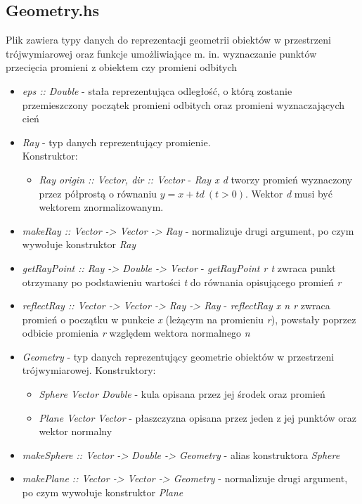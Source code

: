 \documentclass[11pt,a4paper]{article}
\begin{document}
\subsection{Geometry.hs}
Plik zawiera typy danych do reprezentacji geometrii obiektów w przestrzeni trójwymiarowej oraz funkcje umożliwiające m. in. wyznaczanie punktów przecięcia promieni z obiektem czy promieni odbitych
\begin{itemize}
\item\textit{eps :: Double} - stała reprezentująca odległość, o którą zostanie przemieszczony początek promieni odbitych oraz promieni wyznaczających cień
\item\textit{Ray} - typ danych reprezentujący promienie.\\Konstruktor:
\begin{itemize}
\item\textit{Ray { origin :: Vector, dir :: Vector }} - \textit{Ray x d} tworzy promień wyznaczony przez półprostą o równaniu $y = x + td\ (t > 0)$. Wektor \textit{d} musi być wektorem znormalizowanym.
\end{itemize}
\item\textit{makeRay :: Vector -> Vector -> Ray} - normalizuje drugi argument, po czym wywołuje konstruktor \textit{Ray}
\item\textit{getRayPoint :: Ray -> Double -> Vector} - \textit{getRayPoint r t} zwraca punkt otrzymany po podstawieniu wartości \textit{t} do równania opisującego promień \textit{r}
\item\textit{reflectRay :: Vector -> Vector -> Ray -> Ray} - \textit{reflectRay x n r} zwraca promień o początku w punkcie \textit{x} (leżącym na promieniu \textit{r}), powstały poprzez odbicie promienia \textit{r} względem wektora normalnego \textit{n}
\item\textit{Geometry} - typ danych reprezentujący geometrie obiektów w przestrzeni trójwymiarowej. Konstruktory:
\begin{itemize}
\item\textit{Sphere Vector Double} - kula opisana przez jej środek oraz promień
\item\textit{Plane Vector Vector} - płaszczyzna opisana przez jeden z jej punktów oraz wektor normalny
\end{itemize}
\item\textit{makeSphere :: Vector -> Double -> Geometry} - alias konstruktora \textit{Sphere}
\item\textit{makePlane :: Vector -> Vector -> Geometry} - normalizuje drugi argument, po czym wywołuje konstruktor \textit{Plane}

\end{itemize}
\end{document}
